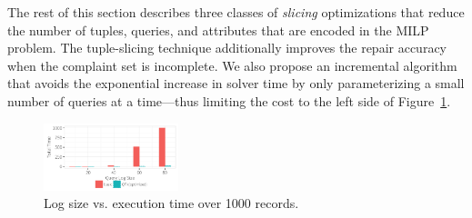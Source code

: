 {%


The rest of this section describes three classes of \emph{slicing} optimizations that 
reduce the number of tuples, queries, and attributes that are encoded in the MILP problem. 
The tuple-slicing technique additionally improves the repair accuracy when the complaint set is incomplete. %
We also propose an incremental algorithm that avoids the exponential increase in solver time by only parameterizing a small number of queries at a time---thus limiting
the cost to the left side of Figure~\ref{fig:querysize_vs_time}.
}


\begin{figure}[h]
    \centering
    \includegraphics[width=0.35\textwidth]{figures/qsize_time_badscale}
    \vspace*{-0.1in}
    \caption{Log size vs. execution time over 1000 records. }
    \label{fig:querysize_vs_time}
\end{figure}
\vspace*{-0.1in}


